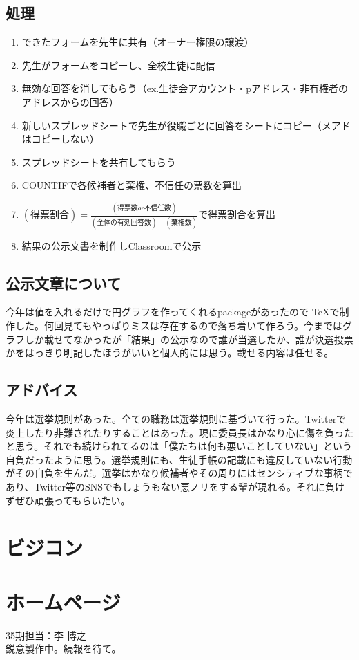 \documentclass[dvipdfmx,jb5]{jarticle}
\begin{document}
\subsection{処理}
\begin{enumerate}
\item できたフォームを先生に共有（オーナー権限の譲渡）
\item 先生がフォームをコピーし、全校生徒に配信
\item 無効な回答を消してもらう（ex.生徒会アカウント・pアドレス・非有権者のアドレスからの回答）
\item 新しいスプレッドシートで先生が役職ごとに回答をシートにコピー（メアドはコピーしない）
\item スプレッドシートを共有してもらう
\item COUNTIFで各候補者と棄権、不信任の票数を算出
\item $(得票割合)=\frac{(得票数or不信任数)}{(全体の有効回答数) - (棄権数)}$で得票割合を算出
\item 結果の公示文書を制作しClassroomで公示
\end{enumerate}
\subsection{公示文章について}
今年は値を入れるだけで円グラフを作ってくれるpackageがあったので \TeX で制作した。何回見てもやっぱりミスは存在するので落ち着いて作ろう。今まではグラフしか載せてなかったが「結果」の公示なので誰が当選したか、誰が決選投票かをはっきり明記したほうがいいと個人的には思う。載せる内容は任せる。
\subsection{アドバイス}
今年は選挙規則があった。全ての職務は選挙規則に基づいて行った。Twitterで炎上したり非難されたりすることはあった。現に委員長はかなり心に傷を負ったと思う。それでも続けられてるのは「僕たちは何も悪いことしていない」という自負だったように思う。選挙規則にも、生徒手帳の記載にも違反していない行動がその自負を生んだ。選挙はかなり候補者やその周りにはセンシティブな事柄であり、Twitter等のSNSでもしょうもない悪ノリをする輩が現れる。それに負けずぜひ頑張ってもらいたい。
\section{ビジコン}
\section{ホームページ}
35期担当：李 博之\\
鋭意製作中。続報を待て。
\end{document}
